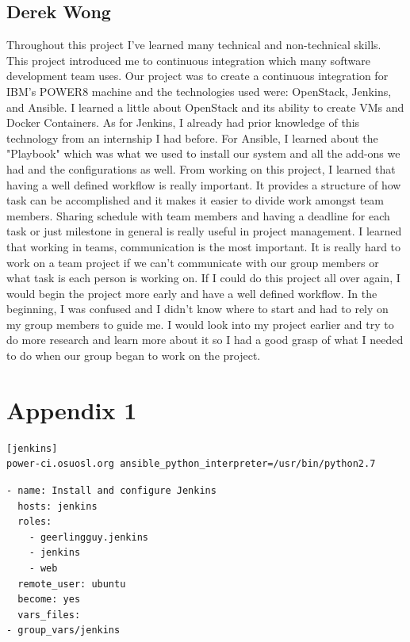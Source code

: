 \documentclass[10pt,letterpaper,onecolumn,draftclsnofoot]{IEEEtran}
\begin{document}
\subsection{Derek Wong}
Throughout this project I've learned many technical and non-technical skills.
This project introduced me to continuous integration which many software development team uses.
Our project was to create a continuous integration for IBM's POWER8 machine and the technologies used were:
OpenStack, Jenkins, and Ansible. I learned a little about OpenStack and its ability to create VMs and Docker Containers.
As for Jenkins, I already had prior knowledge of this technology from an internship I had before.
For Ansible, I learned about the "Playbook" which was what we used to install our system and
all the add-ons we had and the configurations as well.
From working on this project, I learned that having a well defined workflow is really important.
It provides a structure of how task can be accomplished and it makes it easier to divide work amongst team members.
Sharing schedule with team members and having a deadline for each task or just milestone in 
general is really useful in project management.
I learned that working in teams, communication is the most important.
It is really hard to work on a team project if we can't communicate with our group members or what task is each person is working on.
If I could do this project all over again, I would begin the project more early and have a well defined workflow.
In the beginning, I was confused and I didn't know where to start and had to rely on my group members to guide me.
I would look into my project earlier and try to do more research and learn more about it so I 
had a good grasp of what I needed to do when our group began to work on the project.

\clearpage


\clearpage

\section{Appendix 1}

\begin{lstlisting}[caption=Ansible Host file]
[jenkins]
power-ci.osuosl.org ansible_python_interpreter=/usr/bin/python2.7
\end{lstlisting}

\begin{lstlisting}[caption=Ansible Playbook]
- name: Install and configure Jenkins
  hosts: jenkins
  roles:
    - geerlingguy.jenkins
    - jenkins
    - web
  remote_user: ubuntu
  become: yes
  vars_files:
- group_vars/jenkins
\end{lstlisting}
\end{document}
